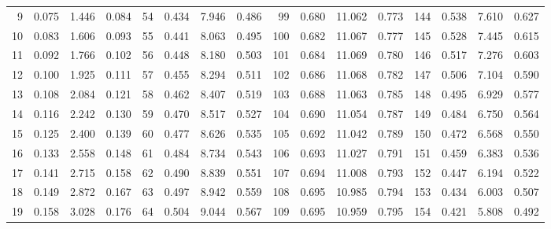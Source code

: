 \begin{table}
{\begin{tabular}{rrrr|rrrr|rrrr|rrrr}
  9 & \tiny{  0.075} &   1.446 & \tiny{  0.084} &  54 & \tiny{  0.434} &   7.946 & \tiny{  0.486} &  99 & \tiny{  0.680} &  11.062 & \tiny{  0.773} & 144 & \tiny{  0.538} &   7.610 & \tiny{  0.627}\\
 10 & \tiny{  0.083} &   1.606 & \tiny{  0.093} &  55 & \tiny{  0.441} &   8.063 & \tiny{  0.495} & 100 & \tiny{  0.682} &  11.067 & \tiny{  0.777} & 145 & \tiny{  0.528} &   7.445 & \tiny{  0.615}\\
 11 & \tiny{  0.092} &   1.766 & \tiny{  0.102} &  56 & \tiny{  0.448} &   8.180 & \tiny{  0.503} & 101 & \tiny{  0.684} &  11.069 & \tiny{  0.780} & 146 & \tiny{  0.517} &   7.276 & \tiny{  0.603}\\
 12 & \tiny{  0.100} &   1.925 & \tiny{  0.111} &  57 & \tiny{  0.455} &   8.294 & \tiny{  0.511} & 102 & \tiny{  0.686} &  11.068 & \tiny{  0.782} & 147 & \tiny{  0.506} &   7.104 & \tiny{  0.590}\\
 13 & \tiny{  0.108} &   2.084 & \tiny{  0.121} &  58 & \tiny{  0.462} &   8.407 & \tiny{  0.519} & 103 & \tiny{  0.688} &  11.063 & \tiny{  0.785} & 148 & \tiny{  0.495} &   6.929 & \tiny{  0.577}\\
 14 & \tiny{  0.116} &   2.242 & \tiny{  0.130} &  59 & \tiny{  0.470} &   8.517 & \tiny{  0.527} & 104 & \tiny{  0.690} &  11.054 & \tiny{  0.787} & 149 & \tiny{  0.484} &   6.750 & \tiny{  0.564}\\
 15 & \tiny{  0.125} &   2.400 & \tiny{  0.139} &  60 & \tiny{  0.477} &   8.626 & \tiny{  0.535} & 105 & \tiny{  0.692} &  11.042 & \tiny{  0.789} & 150 & \tiny{  0.472} &   6.568 & \tiny{  0.550}\\
 16 & \tiny{  0.133} &   2.558 & \tiny{  0.148} &  61 & \tiny{  0.484} &   8.734 & \tiny{  0.543} & 106 & \tiny{  0.693} &  11.027 & \tiny{  0.791} & 151 & \tiny{  0.459} &   6.383 & \tiny{  0.536}\\
 17 & \tiny{  0.141} &   2.715 & \tiny{  0.158} &  62 & \tiny{  0.490} &   8.839 & \tiny{  0.551} & 107 & \tiny{  0.694} &  11.008 & \tiny{  0.793} & 152 & \tiny{  0.447} &   6.194 & \tiny{  0.522}\\
 18 & \tiny{  0.149} &   2.872 & \tiny{  0.167} &  63 & \tiny{  0.497} &   8.942 & \tiny{  0.559} & 108 & \tiny{  0.695} &  10.985 & \tiny{  0.794} & 153 & \tiny{  0.434} &   6.003 & \tiny{  0.507}\\
 19 & \tiny{  0.158} &   3.028 & \tiny{  0.176} &  64 & \tiny{  0.504} &   9.044 & \tiny{  0.567} & 109 & \tiny{  0.695} &  10.959 & \tiny{  0.795} & 154 & \tiny{  0.421} &   5.808 & \tiny{  0.492}\\

\end{tabular}}
\end{table}
